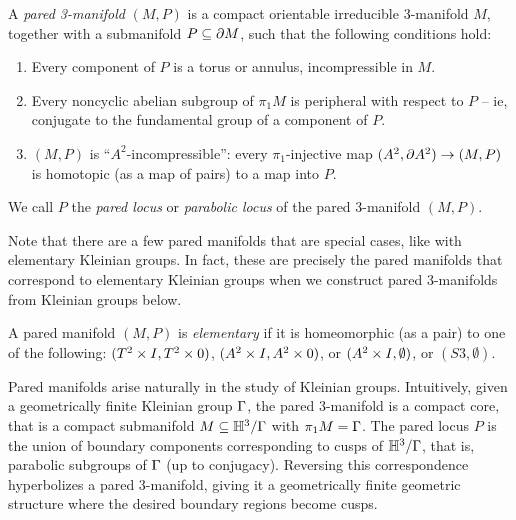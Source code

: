 %
\begin{defn}

A \emph{pared 3-manifold} $(M,P)$ is a compact orientable irreducible
3-manifold $M$, together with a submanifold $P\subseteq\partial M$, such that the
following conditions hold:

\begin{enumerate}
\item Every component of $P$ is a torus or annulus, incompressible in $M$.

\item Every noncyclic abelian subgroup of $\pi_1M$ is peripheral with respect
to $P$ -- ie, conjugate to the fundamental group of a component of $P$.

\item $(M,P)$ is ``$A^2$-incompressible'': every $\pi_1$-injective map $(A^2,
\partial A^2) \to (M,P)$ is homotopic (as a map of pairs) to a map into $P$.

\end{enumerate}

We call $P$ the \emph{pared locus} or \emph{parabolic locus} of the pared
3-manifold $(M,P)$.

\end{defn}

Note that there are a few pared manifolds that are special cases, like with
elementary Kleinian groups. In fact, these are precisely the pared manifolds
that correspond to elementary Kleinian groups when we construct pared
3-manifolds from Kleinian groups below.

\begin{defn}

A pared manifold $(M,P)$ is \emph{elementary} if it is homeomorphic (as a pair)
to one of the following: $(T^2\times I,T^2\times 0)$, $(A^2\times I,A^2\times 0)$, or $(A^2\times
I,\emptyset)$, or $(S3,\emptyset)$.

\end{defn}

Pared manifolds arise naturally in the study of Kleinian groups. Intuitively,
given a geometrically finite Kleinian group $\Gamma$, the pared 3-manifold is
a compact core, that is a compact submanifold $M \subseteq \mathbb{H}^3/\Gamma$ with $\pi_1M
= \Gamma$.  The pared locus $P$ is the union of boundary components corresponding
to cusps of $\mathbb{H}^3/\Gamma$, that is, parabolic subgroups of $\Gamma$ (up to
conjugacy).  Reversing this correspondence hyperbolizes a pared 3-manifold,
giving it a geometrically finite geometric structure where the desired boundary
regions become cusps.

